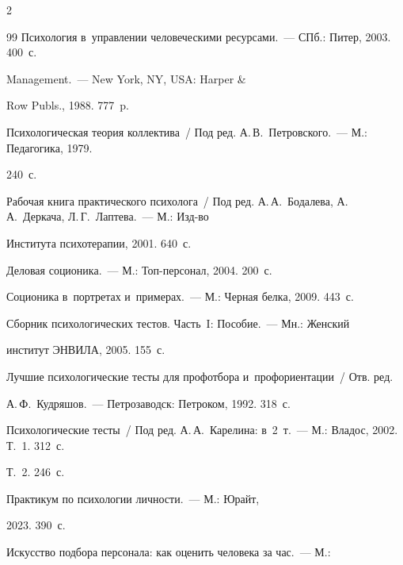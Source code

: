 \begin{multicols}{2}
{{\begin{thebibliography}{99}
 Психология в~управ\-ле\-нии человеческими ресурсами.~--- СПб.: Питер, 2003. 400~с.


 Management.~--- New York, NY, USA: Harper \& 

Row Publs., 1988. 777~p.


Психологическая теория коллектива~/ Под ред. А.\,В.~Пет\-ров\-ско\-го.~--- М.: Педагогика, 1979. 

240~с.


Рабочая книга практического психолога~/ Под ред. А.\,А.~Бодалева, А.\,А.~Деркача, Л.\,Г.~Лаптева.~--- М.: Изд-во 

Института психотерапии, 2001. 640~с.


 Деловая соционика.~--- М.: Топ-пер\-со\-нал, 2004. 200~с.


 Соционика в~портретах и~примерах.~--- М.: Черная белка, 2009. 443~с.


 Сборник психологических тес\-тов. Часть~I: Пособие.~--- Мн.: Женский 

институт \mbox{ЭНВИЛА}, 2005. 155~с.






Лучшие психологические тесты для профотбора и~профориентации~/ Отв. ред. 

А.\,Ф.~Кудряшов.~--- Петрозаводск: Петроком, 1992. 318~с.


Психологические тесты~/ Под ред. А.\,А.~Карелина: в~2~т.~--- М.: Владос, 2002. Т.~1. 312~с. 

Т.~2. 246~с.


 Практикум по психологии личности.~--- М.: Юрайт, 

2023. 390~с.




 Искусство подбора персонала: как оценить человека за час.~--- М.: 


\end{thebibliography}}}
\end{multicols}
